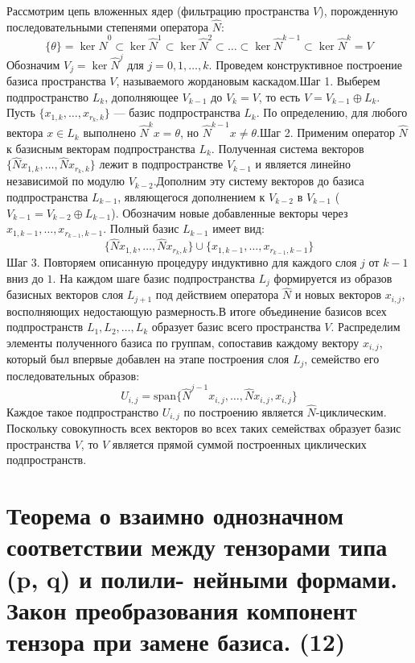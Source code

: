 \documentclass[14pt]{extreport}
\begin{document}
    \begin{prbox}
        Рассмотрим цепь вложенных ядер (фильтрацию пространства $V$), порожденную последовательными степенями оператора $\hat{N}$:$$\{\theta\} = \ker \hat{N}^0 \subset \ker \hat{N}^1 \subset \ker \hat{N}^2 \subset \dots \subset \ker \hat{N}^{k-1} \subset \ker \hat{N}^k = V$$Обозначим $V_j = \ker \hat{N}^j$ для $j = 0, 1, \dots, k$. Проведем конструктивное построение базиса пространства $V$, называемого жордановым каскадом.Шаг 1. Выберем подпространство $L_k$, дополняющее $V_{k-1}$ до $V_k = V$, то есть $V = V_{k-1} \oplus L_k$. Пусть $\{x_{1,k}, \dots, x_{r_k,k}\}$ — базис подпространства $L_k$. По определению, для любого вектора $x \in L_k$ выполнено $\hat{N}^k x = \theta$, но $\hat{N}^{k-1} x \neq \theta$.Шаг 2. Применим оператор $\hat{N}$ к базисным векторам подпространства $L_k$. Полученная система векторов $\{\hat{N}x_{1,k}, \dots, \hat{N}x_{r_k,k}\}$ лежит в подпространстве $V_{k-1}$ и является линейно независимой по модулю $V_{k-2}$.Дополним эту систему векторов до базиса подпространства $L_{k-1}$, являющегося дополнением к $V_{k-2}$ в $V_{k-1}$ ($V_{k-1} = V_{k-2} \oplus L_{k-1}$). Обозначим новые добавленные векторы через $x_{1,k-1}, \dots, x_{r_{k-1},k-1}$. Полный базис $L_{k-1}$ имеет вид:$$\{\hat{N}x_{1,k}, \dots, \hat{N}x_{r_k,k}\} \cup \{x_{1,k-1}, \dots, x_{r_{k-1},k-1}\}$$Шаг 3. Повторяем описанную процедуру индуктивно для каждого слоя $j$ от $k-1$ вниз до $1$. На каждом шаге базис подпространства $L_j$ формируется из образов базисных векторов слоя $L_{j+1}$ под действием оператора $\hat{N}$ и новых векторов $x_{i,j}$, восполняющих недостающую размерность.В итоге объединение базисов всех подпространств $L_1, L_2, \dots, L_k$ образует базис всего пространства $V$. Распределим элементы полученного базиса по группам, сопоставив каждому вектору $x_{i,j}$, который был впервые добавлен на этапе построения слоя $L_j$, семейство его последовательных образов:$$U_{i,j} = \text{span} \{ \hat{N}^{j-1}x_{i,j}, \dots, \hat{N}x_{i,j}, x_{i,j} \}$$Каждое такое подпространство $U_{i,j}$ по построению является $\hat{N}$-циклическим. Поскольку совокупность всех векторов во всех таких семействах образует базис пространства $V$, то $V$ является прямой суммой построенных циклических подпространств.
    \end{prbox}


    \chapter{Теорема о взаимно однозначном соответствии между тензорами типа (p, q) и полили-
нейными формами. Закон преобразования компонент тензора при замене базиса. (12)}
\end{document}
